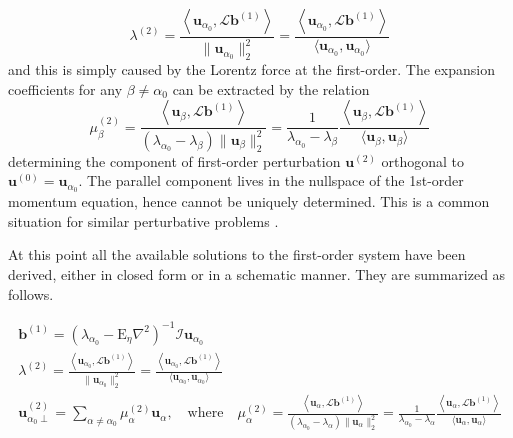 %
\begin{equation}
    \lambda^{(2)} = \frac{\left\langle \mathbf{u}_{\alpha_0}, \mathcal{L} \mathbf{b}^{(1)} \right\rangle}{\|\mathbf{u}_{\alpha_0}\|_2^2} = \frac{\left\langle \mathbf{u}_{\alpha_0}, \mathcal{L} \mathbf{b}^{(1)} \right\rangle}{\langle \mathbf{u}_{\alpha_0}, \mathbf{u}_{\alpha_0} \rangle}
\end{equation}
%
and this is simply caused by the Lorentz force at the first-order. The expansion coefficients for any $\beta \neq \alpha_0$ can be extracted by the relation
%
\begin{equation}
    \mu_\beta^{(2)} = \frac{\left\langle \mathbf{u}_{\beta}, \mathcal{L} \mathbf{b}^{(1)} \right\rangle}{\left(\lambda_{\alpha_0} - \lambda_\beta\right)\|\mathbf{u}_{\beta}\|_2^2} = \frac{1}{\lambda_{\alpha_0} - \lambda_\beta} \frac{\left\langle \mathbf{u}_{\beta}, \mathcal{L} \mathbf{b}^{(1)} \right\rangle}{\langle \mathbf{u}_{\beta}, \mathbf{u}_{\beta} \rangle}
\end{equation}
%
determining the component of first-order perturbation $\mathbf{u}^{(2)}$ orthogonal to $\mathbf{u}^{(0)} = \mathbf{u}_{\alpha_0}$. The parallel component lives in the nullspace of the 1st-order momentum equation, hence cannot be uniquely determined. This is a common situation for similar perturbative problems \citep[e.g.][]{maitra_waves_2023}.

At this point all the available solutions to the first-order system have been derived, either in closed form or in a schematic manner. They are summarized as follows.
%
\begin{mdframed}[style=HighlightBox, frametitle={General formulae for first-order perturbations}]
\begin{gather*}
    \mathbf{b}^{(1)} = \left(\lambda_{\alpha_0} - \mathrm{E}_\eta \nabla^2\right)^{-1} \mathcal{I} \mathbf{u}_{\alpha_0}
    \\
    \lambda^{(2)} = \frac{\left\langle \mathbf{u}_{\alpha_0}, \mathcal{L} \mathbf{b}^{(1)} \right\rangle}{\|\mathbf{u}_{\alpha_0}\|_2^2} = \frac{\left\langle \mathbf{u}_{\alpha_0}, \mathcal{L} \mathbf{b}^{(1)} \right\rangle}{\langle \mathbf{u}_{\alpha_0}, \mathbf{u}_{\alpha_0} \rangle}
    \\
    \mathbf{u}^{(2)}_{\alpha_0 \perp} = \sum_{\alpha \neq \alpha_0} \mu_\alpha^{(2)} \mathbf{u}_{\alpha},\quad \text{where} \quad 
    \mu_\alpha^{(2)} = \frac{\left\langle \mathbf{u}_{\alpha}, \mathcal{L} \mathbf{b}^{(1)} \right\rangle}{\left(\lambda_{\alpha_0} - \lambda_\alpha\right)\|\mathbf{u}_{\alpha}\|_2^2} = \frac{1}{\lambda_{\alpha_0} - \lambda_\alpha} \frac{\left\langle \mathbf{u}_{\alpha}, \mathcal{L} \mathbf{b}^{(1)} \right\rangle}{\langle \mathbf{u}_{\alpha}, \mathbf{u}_{\alpha} \rangle}
\end{gather*}
\end{mdframed}

